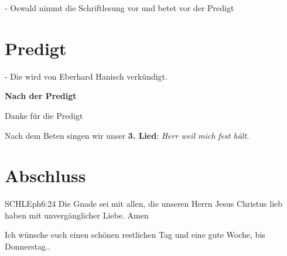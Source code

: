 - Oswald nimmt die Schriftlesung vor und betet vor der Predigt

\section{Predigt}
- Die wird von Eberhard Hanisch verkündigt.

\textbf{Nach der Predigt}

Danke für die Predigt

Nach dem Beten singen wir unser \textbf{3. Lied}: \textit{Herr weil mich fest hält.}\\

\section{Abschluss}

\begin{bibelbox}{SCHL}{Eph}{6:24}
Die Gnade sei mit allen, die unseren Herrn Jesus Christus lieb haben mit unvergänglicher Liebe. Amen
\end{bibelbox}

Ich wünsche euch einen schönen restlichen Tag und eine gute Woche, bis Donnerstag..
